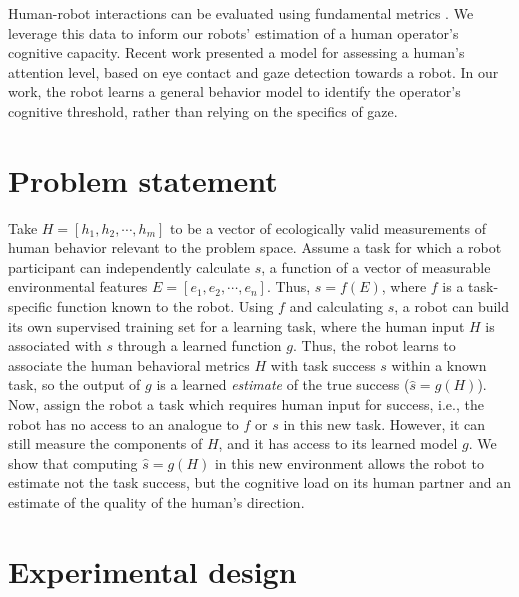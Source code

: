 \documentclass{sig-alternate-05-2015}
\begin{document}
Human-robot interactions can be evaluated using fundamental metrics
\cite{olsen2003metrics}.  We leverage this data to inform our robots'
estimation of a human operator's cognitive capacity.  Recent work
\cite{das2013attention,Hoque:2012:ACH:2157689.2157729} presented a
model for assessing a human's attention level, based on eye contact
and gaze detection towards a robot.  In our work, the robot learns a
general behavior model to identify the operator's cognitive threshold,
rather than relying on the specifics of gaze.


\section{Problem statement}

Take $H=[h_1,h_2,\cdots,h_m]$ to be a vector of ecologically valid
measurements of human behavior relevant to the problem space.  Assume
a task for which a robot participant can independently calculate $s$,
a function of a vector of measurable environmental features
$E=[e_1,e_2,\cdots,e_n]$.  Thus, $s = f(E)$, where $f$ is a
task-specific function known to the robot.  Using $f$ and calculating
$s$, a robot can build its own supervised training set for a learning
task, where the human input $H$ is associated with $s$ through a
learned function $g$.  Thus, the robot learns to associate the human
behavioral metrics $H$ with task success $s$ within a known task, so
the output of $g$ is a learned \emph{estimate} of the true success
($\hat{s}=g(H)$).  Now, assign the robot a task which requires human
input for success, i.e., the robot has no access to an analogue to $f$
or $s$ in this new task.  However, it can still measure the components
of $H$, and it has access to its learned model $g$.  We show that
computing $\hat{s}=g(H)$ in this new environment allows the robot to
estimate not the task success, but the cognitive load on its human
partner and an estimate of the quality of the human's direction.

\section{Experimental design} 
\end{document}
